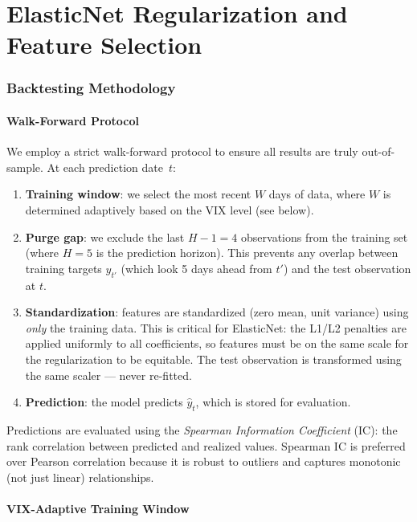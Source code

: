 \documentclass[11pt,a4paper]{article}
\begin{document}
\part{ElasticNet Regularization and Feature Selection}

\section{Backtesting Methodology}
\label{sec:methodology}

\subsection{Walk-Forward Protocol}

We employ a strict walk-forward protocol to ensure all results are truly out-of-sample. At each prediction date~$t$:

\begin{enumerate}
    \item \textbf{Training window}: we select the most recent $W$ days of data, where $W$ is determined adaptively based on the VIX level (see below).
    \item \textbf{Purge gap}: we exclude the last $H-1 = 4$ observations from the training set (where $H=5$ is the prediction horizon). This prevents any overlap between training targets $y_{t'}$ (which look 5 days ahead from $t'$) and the test observation at $t$.
    \item \textbf{Standardization}: features are standardized (zero mean, unit variance) using \textit{only} the training data. This is critical for ElasticNet: the L1/L2 penalties are applied uniformly to all coefficients, so features must be on the same scale for the regularization to be equitable. The test observation is transformed using the same scaler --- never re-fitted.
    \item \textbf{Prediction}: the model predicts $\hat{y}_t$, which is stored for evaluation.
\end{enumerate}

Predictions are evaluated using the \textit{Spearman Information Coefficient} (IC): the rank correlation between predicted and realized values. Spearman IC is preferred over Pearson correlation because it is robust to outliers and captures monotonic (not just linear) relationships.

\subsection{VIX-Adaptive Training Window}
\end{document}
